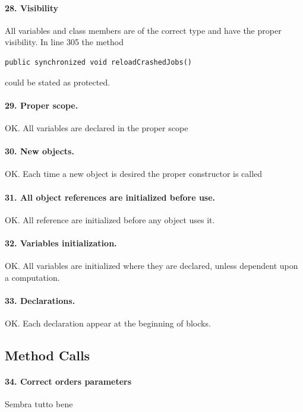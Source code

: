 \documentclass[english]{article}
\begin{document}
\paragraph{28. Visibility}
All variables and class members are of the correct type and have the proper visibility.
In line 305 the method 
\begin{lstlisting} 
public synchronized void reloadCrashedJobs()
\end{lstlisting} 
could be stated as protected.

\paragraph{29. Proper scope.} 
OK. All variables are declared in the proper scope

\paragraph{30. New objects.} 
OK. Each time a new object is desired the proper constructor is called

\paragraph{31. All object references are initialized before use.} 
OK. All reference are initialized before any object uses it. 

\paragraph{32. Variables initialization.} 
OK. All variables are initialized where they are declared, unless dependent upon a computation.

\paragraph{33. Declarations.} OK. Each declaration appear at the beginning of blocks.

\subsection{Method Calls}

\paragraph{34. Correct orders parameters}

Sembra tutto bene
\end{document}
